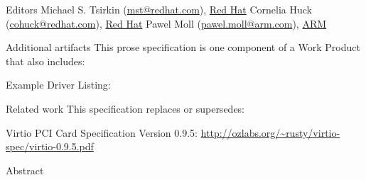 \begin{titlepage}
\begin{oasistitlesection}{Editors}
Michael S. Tsirkin (\href{mailto:mst@redhat.com}{mst@redhat.com}), \href{http://www.redhat.com/}{Red Hat}\newline
Cornelia Huck (\href{mailto:cohuck@redhat.com}{cohuck@redhat.com}), \href{http://www.redhat.com/}{Red Hat}\newline
Pawel Moll (\href{mailto:pawel.moll@arm.com}{pawel.moll@arm.com}), \href{http://www.arm.com/}{ARM}
\end{oasistitlesection}


\begin{oasistitlesection}{Additional artifacts}
This prose specification is one component of a Work Product that also includes:
\begin{itemize*}
	\item Example Driver Listing: \newline
	\virtiourllistings
\end{itemize*}
\end{oasistitlesection}
\vspace{-0.2in}

\begin{oasistitlesection}{Related work}
This specification replaces or supersedes:
\begin{itemize*}
	\item Virtio PCI Card Specification Version 0.9.5:\newline
	\url{http://ozlabs.org/~rusty/virtio-spec/virtio-0.9.5.pdf}
\end{itemize*}
\end{oasistitlesection}
\vspace{-0.2in}

\vfill\newpage

\begin{oasistitlesection}{Abstract}

\end{oasistitlesection}


\end{titlepage}
